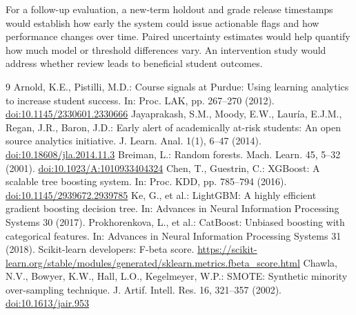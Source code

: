 \documentclass[runningheads]{llncs}
\begin{document}
For a follow-up evaluation, a new-term holdout and grade release timestamps would establish how early the system could issue actionable flags and how performance changes over time. Paired uncertainty estimates would help quantify how much model or threshold differences vary. An intervention study would address whether review leads to beneficial student outcomes.

\begin{thebibliography}{9}
 Arnold, K.E., Pistilli, M.D.: Course signals at Purdue: Using learning analytics to increase student success. In: Proc. LAK, pp. 267--270 (2012). \href{https://doi.org/10.1145/2330601.2330666}{doi:10.1145/2330601.2330666}
 Jayaprakash, S.M., Moody, E.W., Laur\'ia, E.J.M., Regan, J.R., Baron, J.D.: Early alert of academically at-risk students: An open source analytics initiative. J. Learn. Anal. 1(1), 6--47 (2014). \href{https://doi.org/10.18608/jla.2014.11.3}{doi:10.18608/jla.2014.11.3}
 Breiman, L.: Random forests. Mach. Learn. 45, 5--32 (2001). \href{https://doi.org/10.1023/A:1010933404324}{doi:10.1023/A:1010933404324}
 Chen, T., Guestrin, C.: XGBoost: A scalable tree boosting system. In: Proc. KDD, pp. 785--794 (2016). \href{https://doi.org/10.1145/2939672.2939785}{doi:10.1145/2939672.2939785}
 Ke, G., et al.: LightGBM: A highly efficient gradient boosting decision tree. In: Advances in Neural Information Processing Systems 30 (2017).
 Prokhorenkova, L., et al.: CatBoost: Unbiased boosting with categorical features. In: Advances in Neural Information Processing Systems 31 (2018).
 Scikit-learn developers: F-beta score. \url{https://scikit-learn.org/stable/modules/generated/sklearn.metrics.fbeta_score.html}
 Chawla, N.V., Bowyer, K.W., Hall, L.O., Kegelmeyer, W.P.: SMOTE: Synthetic minority over-sampling technique. J. Artif. Intell. Res. 16, 321--357 (2002). \href{https://doi.org/10.1613/jair.953}{doi:10.1613/jair.953}
\end{thebibliography}
\end{document}
